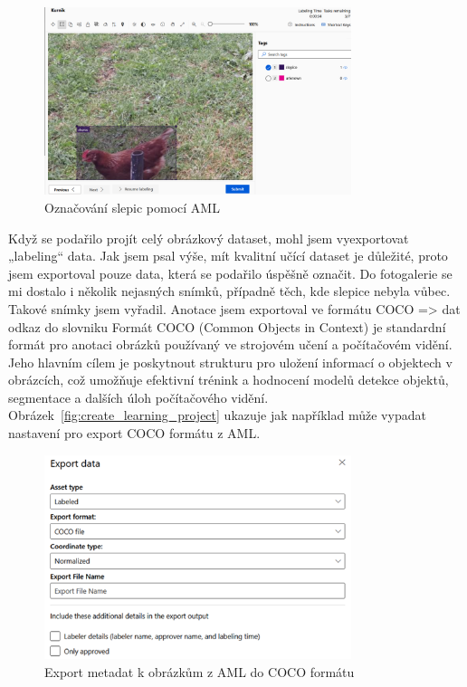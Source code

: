 \begin{figure}[htbp]
    \centering
    \includegraphics[width=0.8\textwidth]{img/chicken_labeling}
    \caption{Označování slepic pomocí AML}
    \label{fig:chicken_labeling}
\end{figure}

Když se podařilo projít celý obrázkový dataset, mohl jsem vyexportovat „labeling“ data.
Jak jsem psal výše, mít kvalitní učící dataset je důležité, proto jsem exportoval pouze data, která se podařilo úspěšně označit.
Do fotogalerie se mi dostalo i několik nejasných snímků, případně těch, kde slepice nebyla vůbec.
Takové snímky jsem vyřadil.
Anotace jsem exportoval ve formátu COCO => dat odkaz do slovniku
Formát COCO (Common Objects in Context) je standardní formát pro anotaci obrázků používaný ve strojovém učení a počítačovém vidění.
Jeho hlavním cílem je poskytnout strukturu pro uložení informací o objektech v obrázcích, což umožňuje efektivní trénink a hodnocení modelů detekce objektů, segmentace a dalších úloh počítačového vidění.
Obrázek~\ref{fig:create_learning_project} ukazuje jak například může vypadat nastavení pro export COCO formátu z AML.

\begin{figure}[htbp]
    \centering
    \includegraphics[width=0.8\textwidth]{img/export_coco_format}
    \caption{Export metadat k obrázkům z AML do COCO formátu}
    \label{fig:export_coco_format}
\end{figure}

